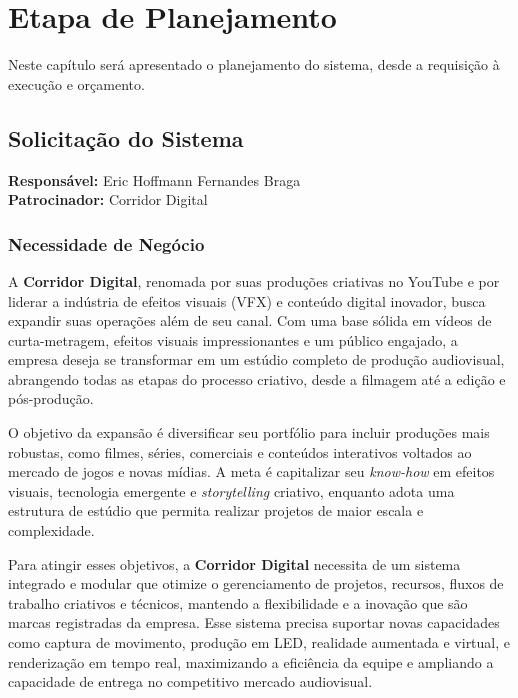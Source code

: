 
\chapter{Etapa de Planejamento}


Neste capítulo será apresentado o planejamento do sistema, desde a requisição à execução e orçamento.

\section{Solicitação do Sistema}

\textbf{Responsável:} Eric Hoffmann Fernandes Braga \\
\textbf{Patrocinador:} Corridor Digital

\subsection{Necessidade de Negócio}

A \textbf{Corridor Digital}, renomada por suas produções criativas no YouTube e por liderar a indústria de efeitos visuais (VFX) e conteúdo digital inovador, busca expandir suas operações além de seu canal. Com uma base sólida em vídeos de curta-metragem, efeitos visuais impressionantes e um público engajado, a empresa deseja se transformar em um estúdio completo de produção audiovisual, abrangendo todas as etapas do processo criativo, desde a filmagem até a edição e pós-produção.

O objetivo da expansão é diversificar seu portfólio para incluir produções mais robustas, como filmes, séries, comerciais e conteúdos interativos voltados ao mercado de jogos e novas mídias. A meta é capitalizar seu \textit{know-how} em efeitos visuais, tecnologia emergente e \textit{storytelling} criativo, enquanto adota uma estrutura de estúdio que permita realizar projetos de maior escala e complexidade.

Para atingir esses objetivos, a \textbf{Corridor Digital} necessita de um sistema integrado e modular que otimize o gerenciamento de projetos, recursos, fluxos de trabalho criativos e técnicos, mantendo a flexibilidade e a inovação que são marcas registradas da empresa. Esse sistema precisa suportar novas capacidades como captura de movimento, produção em LED, realidade aumentada e virtual, e renderização em tempo real, maximizando a eficiência da equipe e ampliando a capacidade de entrega no competitivo mercado audiovisual.

